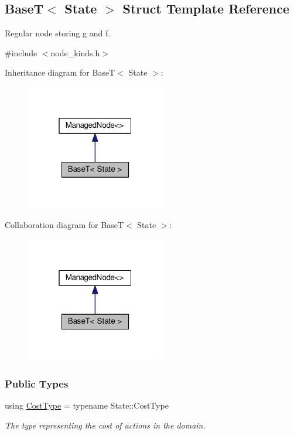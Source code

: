 \hypertarget{structBaseT}{}\subsection{BaseT$<$ State $>$ Struct Template Reference}
\label{structBaseT}


Regular node storing {\ttfamily g} and {\ttfamily f}.  




{\ttfamily \#include $<$node\+\_\+kinds.\+h$>$}



Inheritance diagram for BaseT$<$ State $>$\+:\nopagebreak
\begin{figure}[H]
\begin{center}
\leavevmode
\includegraphics[width=172pt]{structBaseT__inherit__graph}
\end{center}
\end{figure}


Collaboration diagram for BaseT$<$ State $>$\+:\nopagebreak
\begin{figure}[H]
\begin{center}
\leavevmode
\includegraphics[width=172pt]{structBaseT__coll__graph}
\end{center}
\end{figure}
\subsubsection*{Public Types}
\begin{DoxyCompactItemize}
\item 
using \hyperlink{structBaseT_a7e56fdca21a53938a87fa1ad516027ea}{Cost\+Type} = typename State\+::\+Cost\+Type\hypertarget{structBaseT_a7e56fdca21a53938a87fa1ad516027ea}{}\label{structBaseT_a7e56fdca21a53938a87fa1ad516027ea}

\begin{DoxyCompactList}\small\item\em The type representing the cost of actions in the domain. \end{DoxyCompactList}\end{DoxyCompactItemize}
